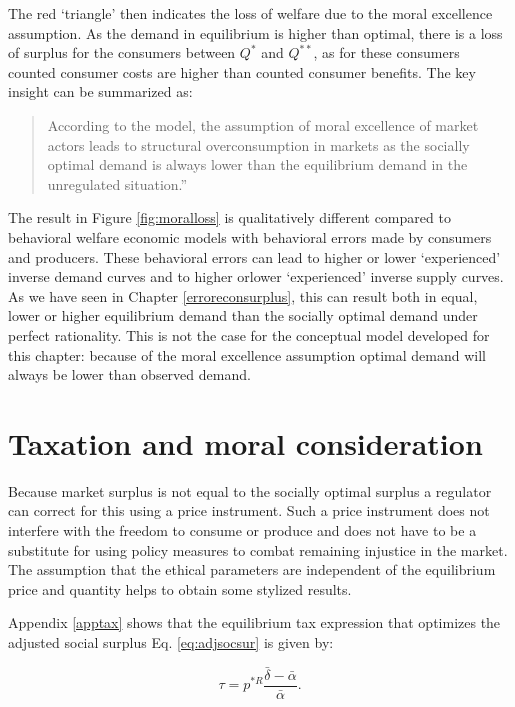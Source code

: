 \documentclass[
]{book}
\begin{document}
The red `triangle' then indicates the loss of welfare due to the moral excellence assumption. As the demand in equilibrium is higher than optimal, there is a loss of surplus for the consumers between \(Q^*\) and \(Q^{**}\), as for these consumers counted consumer costs are higher than counted consumer benefits. The key insight can be summarized as:

\begin{quote}
According to the model, the assumption of moral excellence of market actors leads to structural overconsumption in markets as the socially optimal demand is always lower than the equilibrium demand in the unregulated situation.''
\end{quote}

The result in Figure \ref{fig:moralloss} is qualitatively different compared to behavioral welfare economic models with behavioral errors made by consumers and producers. These behavioral errors can lead to higher or lower `experienced' inverse demand curves and to higher orlower `experienced' inverse supply curves. As we have seen in Chapter \ref{erroreconsurplus}, this can result both in equal, lower or higher equilibrium demand than the socially optimal demand under perfect rationality. This is not the case for the conceptual model developed for this chapter: because of the moral excellence assumption optimal demand will always be lower than observed demand.

\hypertarget{taxation-and-moral-consideration}{%
\section{Taxation and moral consideration}\label{taxation-and-moral-consideration}}

Because market surplus is not equal to the socially optimal surplus a regulator can correct for this using a price instrument. Such a price instrument does not interfere with the freedom to consume or produce and does not have to be a substitute for using policy measures to combat remaining injustice in the market. The assumption that the ethical parameters are independent of the equilibrium price and quantity helps to obtain some stylized results.

Appendix \ref{apptax} shows that the equilibrium tax expression that optimizes the adjusted social surplus Eq. \eqref{eq:adjsocsur} is given by:

\begin{equation}
 \tau = p^{*R} \frac{\bar{\delta} - \bar{\alpha}}{\bar{\alpha}}.
   \label{eq:taxmoral}
\end{equation}
\end{document}
